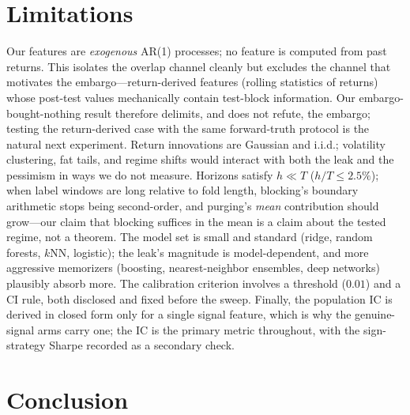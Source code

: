 \documentclass[11pt]{article}
\begin{document}
\section{Limitations}
\label{sec:limitations}

Our features are \emph{exogenous} AR(1) processes; no feature is computed
from past returns. This isolates the overlap channel cleanly but excludes
the channel that motivates the embargo---return-derived features (rolling
statistics of returns) whose post-test values mechanically contain test-block
information. Our embargo-bought-nothing result therefore delimits, and does
not refute, the embargo; testing the return-derived case with the same
forward-truth protocol is the natural next experiment. Return innovations
are Gaussian and i.i.d.; volatility clustering, fat tails, and regime
shifts would interact with both the leak and the pessimism in ways we do
not measure. Horizons satisfy $h \ll T$ ($h/T \le 2.5\%$); when label
windows are long relative to fold length, blocking's boundary arithmetic
stops being second-order, and purging's \emph{mean} contribution should
grow---our claim that blocking suffices in the mean is a claim about the
tested regime, not a theorem. The model set is small and standard (ridge,
random forests, $k$NN, logistic); the leak's magnitude is model-dependent,
and more aggressive memorizers (boosting, nearest-neighbor ensembles, deep
networks) plausibly absorb more. The calibration criterion involves a
threshold ($0.01$) and a CI rule, both disclosed and fixed before the
sweep. Finally, the population IC is derived in closed form only for a
single signal feature, which is why the genuine-signal arms carry one; the
IC is the primary metric throughout, with the sign-strategy Sharpe recorded
as a secondary check.

\section{Conclusion}
\end{document}

